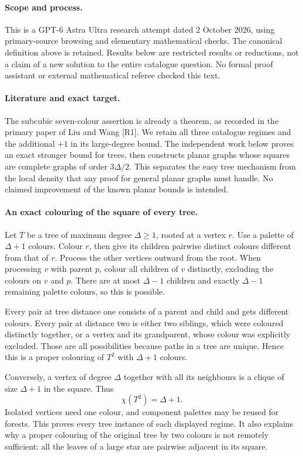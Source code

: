 \documentclass[11pt,a4paper]{article}
\begin{document}
\paragraph{Scope and process.}
This is a GPT-6 Astra Ultra research attempt dated 2 October 2026, using
primary-source browsing and elementary mathematical checks. The canonical
definition above is retained. Results below are restricted results or
reductions, not a claim of a new solution to the entire catalogue question.
No formal proof assistant or external mathematical referee checked this text.


\paragraph{Literature and exact target.}
The subcubic seven-colour assertion is already a theorem, as recorded
in the primary paper of Liu and Wang [R1]. We retain all three
catalogue regimes and the additional $+1$ in its large-degree bound.
The independent work below proves an exact stronger bound for trees,
then constructs planar graphs whose squares are complete graphs of
order $3\Delta/2$. This separates the easy tree mechanism from the
local density that any proof for general planar graphs must handle.
No claimed improvement of the known planar bounds is intended.

\paragraph{An exact colouring of the square of every tree.}
Let $T$ be a tree of maximum degree $\Delta\ge1$, rooted at a
vertex $r$. Use a palette of $\Delta+1$ colours. Colour $r$, then
give its children pairwise distinct colours different from that of
$r$. Process the other vertices outward from the root. When processing
$v$ with parent $p$, colour all children of $v$ distinctly, excluding
the colours on $v$ and $p$. There are at most $\Delta-1$ children
and exactly $\Delta-1$ remaining palette colours, so this is possible.

Every pair at tree distance one consists of a parent and child and
gets different colours. Every pair at distance two is either two
siblings, which were coloured distinctly together, or a vertex and
its grandparent, whose colour was explicitly excluded. Those are all
possibilities because paths in a tree are unique. Hence this is a
proper colouring of $T^2$ with $\Delta+1$ colours.

Conversely, a vertex of degree $\Delta$ together with all its
neighbours is a clique of size $\Delta+1$ in the square. Thus
\[
 \chi(T^2)=\Delta+1.
\]
Isolated vertices need one colour, and component palettes may be reused
for forests. This proves every tree instance of each displayed regime.
It also explains why a proper colouring of the original tree by two
colours is not remotely sufficient: all the leaves of a large star
are pairwise adjacent in its square.
\end{document}
